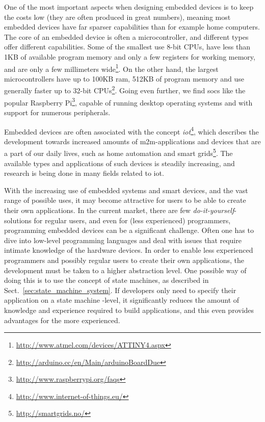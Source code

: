 One of the most important aspects when designing embedded devices is to keep the costs low (they are often produced in great numbers), meaning most embedded devices have far sparser capabilities than for example home computers. The core of an embedded device is often a microcontroller, and different types offer different capabilities. Some of the smallest use 8-bit CPUs, have less than 1KB of available program memory and only a few registers for working memory, and are only a few millimeters wide\footnote{\url{http://www.atmel.com/devices/ATTINY4.aspx}}. On the other hand, the largest microcontrollers have up to 100KB ram, 512KB of program memory and use generally faster up to 32-bit CPUs\footnote{\url{http://arduino.cc/en/Main/arduinoBoardDue}}. Going even further, we find \glspl{soc} like the popular Raspberry Pi\footnote{\url{http://www.raspberrypi.org/faqs}}, capable of running desktop operating systems and with support for numerous peripherals.

Embedded devices are often associated with the concept \emph{\gls{iot}}\footnote{\url{http://www.internet-of-things.eu/}}, which describes the development towards increased amounts of \gls{m2m}-applications and devices that are a part of our daily lives, such as home automation and smart grids\footnote{\url{http://smartgrids.no/}}. The available types and applications of such devices is steadily increasing, and research is being done in many fields related to \gls{iot}.

With the increasing use of embedded systems and smart devices, and the vast range of possible uses, it may become attractive for users to be able to create their own applications. In the current market, there are few \emph{do-it-yourself}-solutions for regular users, and even for (less experienced) programmers, programming embedded devices can be a significant challenge. Often one has to dive into low-level programming languages and deal with issues that require intimate knowledge of the hardware devices. In order to enable less experienced programmers and possibly regular users to create their own applications, the development must be taken to a higher abstraction level. One possible way of doing this is to use the concept of state machines, as described in Sect.~\ref{sec:state_machine_system}. If developers only need to specify their application on a state machine -level, it significantly reduces the amount of knowledge and experience required to build applications, and this even provides advantages for the more experienced.